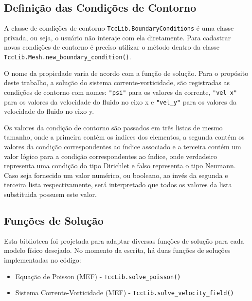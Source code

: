 \subsection{\textbf{Definição das Condições de Contorno}}
A classe de condições de contorno \verb|TccLib.BoundaryConditions| é uma classe privada, ou seja, o usuário não interaje com ela diretamente.
Para cadastrar novas condições de contorno é preciso utilizar o método dentro da classe \verb|TccLib.Mesh.new_boundary_condition()|.

O nome da propiedade varia de acordo com a função de solução.
Para o propósito deste trabalho, a solução do sistema corrente-vorticidade, são registradas as condições de contorno com nomes: \verb|"psi"| para os valores da corrente, \verb|"vel_x"| para os valores da velocidade do fluido no eixo x e  \verb|"vel_y"| para os valores da velocidade do fluido no eixo y.

Os valores da condição de contorno são passados em três listas de mesmo tamanho, onde a primeira contém os índices dos elementos, a segunda contém os valores da condição correspondentes ao índice associado e a terceira contém um valor lógico para a condição correspondentes ao índice, onde verdadeiro representa uma condição do tipo Dirichlet e falso representa o tipo Neumann.
Caso seja fornecido um valor numérico, ou booleano, ao invés da segunda e terceira lista respectivamente, será interpretado que todos os valores da lista substituida possuem este valor.

\subsection{\textbf{Funções de Solução}}
Esta biblioteca foi projetada para adaptar diversas funções de solução para cada modelo físico desejado.
No momento da escrita, há duas funções de soluções implementadas no código:
\begin{itemize}
    \item Equação de Poisson (MEF) - \verb|TccLib.solve_poisson()|
    \item Sistema Corrente-Vorticidade (MEF) - \verb|TccLib.solve_velocity_field()|
\end{itemize}

